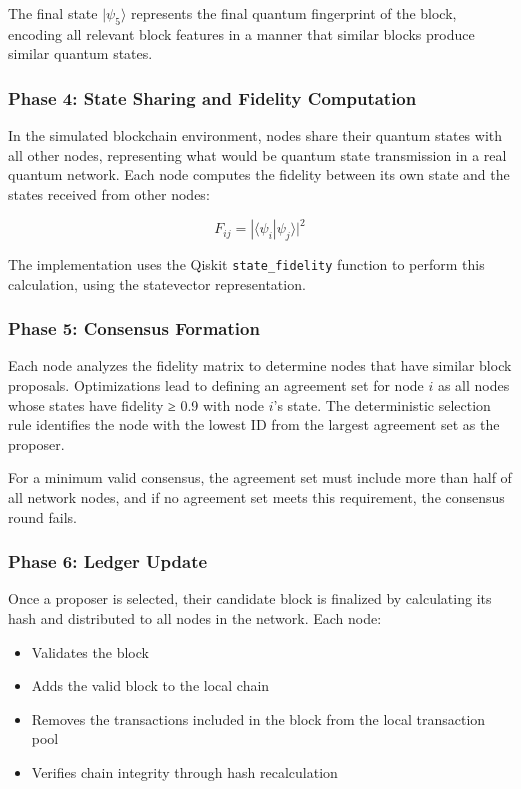 \documentclass[11pt,a4paper]{article}
\begin{document}
The final state $|\psi_5\rangle$ represents the final quantum fingerprint of the block, encoding all relevant block features in a manner that similar blocks produce similar quantum states.

\subsubsection{Phase 4: State Sharing and Fidelity Computation}
In the simulated blockchain environment, nodes share their quantum states with all other nodes, representing what would be quantum state transmission in a real quantum network. Each node computes the fidelity between its own state and the states received from other nodes:

\begin{equation}
F_{ij} = |\langle\psi_i|\psi_j\rangle|^2
\end{equation}

The implementation uses the Qiskit \texttt{state\_fidelity} function to perform this calculation, using the statevector representation.

\subsubsection{Phase 5: Consensus Formation}
Each node analyzes the fidelity matrix to determine nodes that have similar block proposals. Optimizations lead to defining an agreement set for node $i$ as all nodes whose states have fidelity ≥ 0.9 with node $i$'s state. The deterministic selection rule identifies the node with the lowest ID from the largest agreement set as the proposer.

For a minimum valid consensus, the agreement set must include more than half of all network nodes, and if no agreement set meets this requirement, the consensus round fails.

\subsubsection{Phase 6: Ledger Update}
Once a proposer is selected, their candidate block is finalized by calculating its hash and distributed to all nodes in the network. Each node:

\begin{itemize}
    \item Validates the block
    \item Adds the valid block to the local chain
    \item Removes the transactions included in the block from the local transaction pool
    \item Verifies chain integrity through hash recalculation
\end{itemize}
\end{document}
